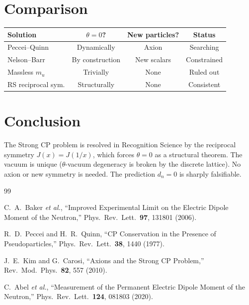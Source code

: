 \documentclass[12pt,a4paper]{article}
\theoremstyle{definition}
\theoremstyle{remark}
\begin{document}
\section{Comparison}
\label{sec:comparison}

\begin{center}
\renewcommand{\arraystretch}{1.3}
\begin{tabular}{lccc}
\hline
\textbf{Solution} & $\theta = 0$? &
\textbf{New particles?} & \textbf{Status} \\
\hline
Peccei--Quinn & Dynamically & Axion & Searching \\
Nelson--Barr & By construction & New scalars & Constrained \\
Massless $m_u$ & Trivially & None & Ruled out \\
RS reciprocal sym. & Structurally & None & Consistent \\
\hline
\end{tabular}
\end{center}

\section{Conclusion}
\label{sec:conclusion}

The Strong CP problem is resolved in Recognition Science by the
reciprocal symmetry $J(x) = J(1/x)$, which forces $\theta = 0$
as a structural theorem.  The vacuum is unique ($\theta$-vacuum
degeneracy is broken by the discrete lattice).  No axion or new
symmetry is needed.  The prediction $d_n = 0$ is sharply falsifiable.

\begin{thebibliography}{99}

C.~A.~Baker \textit{et al.}, ``Improved Experimental Limit on the
Electric Dipole Moment of the Neutron,'' Phys.\ Rev.\ Lett.\
\textbf{97}, 131801 (2006).

R.~D.~Peccei and H.~R.~Quinn, ``CP Conservation in the Presence of
Pseudoparticles,'' Phys.\ Rev.\ Lett.\ \textbf{38}, 1440 (1977).

J.~E.~Kim and G.~Carosi, ``Axions and the Strong CP Problem,''
Rev.\ Mod.\ Phys.\ \textbf{82}, 557 (2010).

C.~Abel \textit{et al.}, ``Measurement of the Permanent Electric
Dipole Moment of the Neutron,'' Phys.\ Rev.\ Lett.\ \textbf{124},
081803 (2020).

\end{thebibliography}
\end{document}
